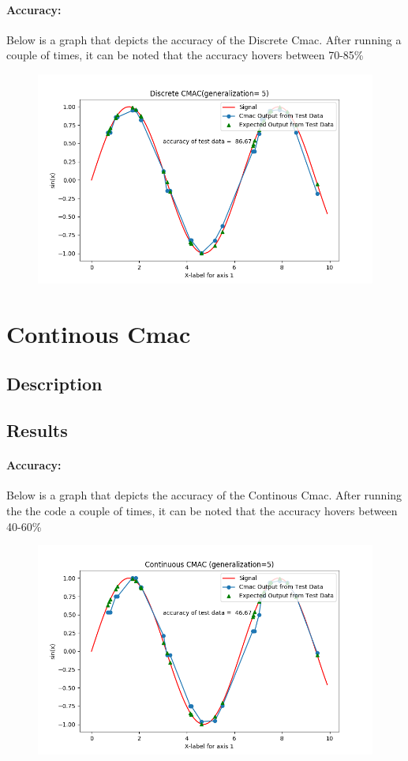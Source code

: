 \documentclass{article}
\begin{document}
  \paragraph{Accuracy:}
    Below is a graph that depicts the accuracy of the Discrete Cmac. After running a couple of times, it can 
    be noted that the accuracy hovers between 70-85\%
  \begin{figure}[h!]
    \includegraphics[scale=0.7]{./Results/discreteAccuracy.png}
  \end{figure}
\newpage 
\section{Continous Cmac}
\subsection{Description}
\subsection{Results}
  \paragraph{Accuracy:}
    Below is a graph that depicts the accuracy of the Continous Cmac. After running the the code a couple of times, it can
    be noted that the accuracy hovers between 40-60\%
  \begin{figure}[h!]
     \includegraphics[scale=0.65]{./Results/continousAccuracy.png}
  \end{figure}
\end{document}
